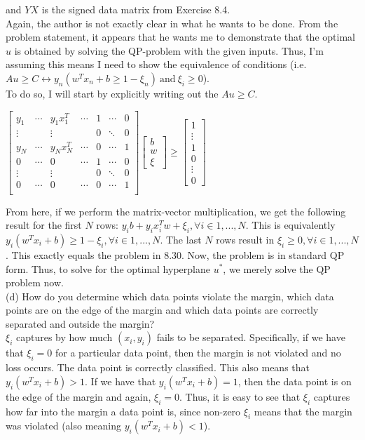 \documentclass[12pt]{article}
\begin{document}
	and $YX$ is the signed data matrix from Exercise 8.4. \\
	Again, the author is not exactly clear in what he wants to be done. From the problem statement, it appears that he wants me to demonstrate that the optimal $u$ is obtained by solving the QP-problem with the given inputs. Thus, I'm assuming this means I need to show the equivalence of conditions (i.e. $Au \ge C \leftrightarrow y_n(w^Tx_n+b \ge 1 - \xi_n) \ \text{and}\  \xi_i \ge 0$). \\
	To do so, I will start by explicitly writing out the $Au \ge C$.
	\begin{center}
	$\left[
	\begin{array}{ccccccc}
	y_1 & \cdots & y_1x_1^T & \cdots & 1 & \cdots & 0 \\
	\vdots & & \vdots & & 0 & \ddots & 0 \\
	y_N & \cdots & y_Nx_N^T & \cdots & 0 & \cdots & 1 \\
	0 & \cdots & 0 & \cdots & 1 & \cdots & 0 \\
	\vdots & & \vdots & & 0 & \ddots & 0 \\
	0 & \cdots & 0 & \cdots & 0 & \cdots & 1 \\
	\end{array}
	\right]
	\left[
	\begin{array}{c}
	b \\
	w \\
	\xi
	\end{array}
	\right]
	\ge
	\left[
	\begin{array}{c}
	1 \\
	\vdots \\
	1 \\
	0 \\
	\vdots \\
	0
	\end{array}
	\right]
	$
	\end{center}
	From here, if we perform the matrix-vector multiplication, we get the following result for the first $N$ rows: $y_i b + y_ix_i^Tw + \xi_i, \forall i \in {1, ..., N}$. This is equivalently $y_i (w^T x_i +b) \ge 1 - \xi_i, \forall i \in {1, ..., N}$. The last $N$ rows result in $\xi_i \ge 0, \forall i \in {1, ..., N}$. This exactly equals the problem in 8.30. Now, the problem is in standard QP form. Thus, to solve for the optimal hyperplane $u^*$, we merely solve the QP problem now.
	\\
	(d) How do you determine which data points violate the margin, which data points are on the edge of the margin and which data points are correctly separated and outside the margin? \\
	$\xi_i$ captures by how much $(x_i,y_i)$ fails to be separated. Specifically, if we have that $\xi_i = 0$ for a particular data point, then the margin is not violated and no loss occurs. The data point is correctly classified. This also means that $y_i(w^Tx_i + b) > 1$. If we have that $y_i(w^Tx_i + b) = 1$, then the data point is on the edge of the margin and again, $\xi_i = 0$. Thus, it is easy to see that $\xi_i$ captures how far into the margin a data point is, since non-zero $\xi_i$ means that the margin was violated (also meaning $y_i(w^Tx_i + b) < 1$).
		
\end{document}
